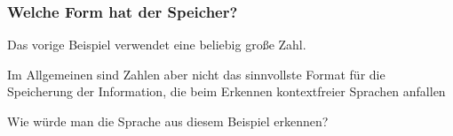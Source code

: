 \documentclass[onlymath]{beamer}
\begin{document}
\begin{frame}\frametitle{Welche Form hat der Speicher?}

Das vorige Beispiel verwendet eine beliebig große \alert{Zahl}.\pause
\medskip

Im Allgemeinen sind Zahlen aber nicht das sinnvollste Format für die Speicherung der
Information, die beim Erkennen kontextfreier Sprachen anfallen
\medskip


Wie würde man die Sprache aus diesem Beispiel erkennen?

\end{frame}
\end{document}

